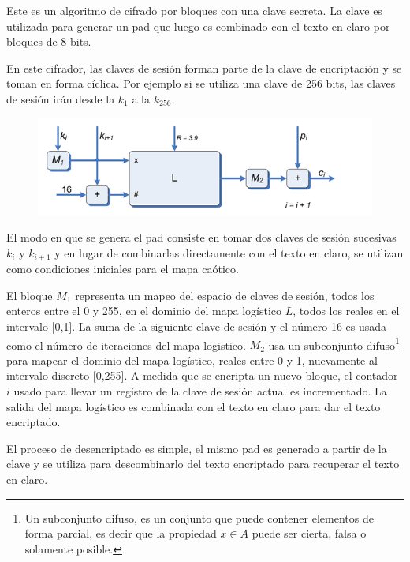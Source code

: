 \begin{example}
Este es un algoritmo de cifrado por bloques con una clave secreta. La clave es utilizada para generar un pad que luego es combinado con el texto en claro por bloques de 8 bits.

En este cifrador, las claves de sesión forman parte de la clave de encriptación y se toman en forma cíclica. Por ejemplo si se utiliza una clave de 256 bits, las claves de sesión irán desde la $k_1$ a la $k_{256}$.

\begin{figure}[H]
\centering
\includegraphics[width = \textwidth]{img/cifradoCaotico.png}
\end{figure}

El modo en que se genera el pad consiste en tomar dos claves de sesión sucesivas $k_i$ y $k_{i+1}$ y en lugar de combinarlas directamente con el texto en claro, se utilizan como condiciones iniciales para el mapa caótico.

El bloque $M_1$ representa un mapeo del espacio de claves de sesión, todos los enteros entre el 0 y 255, en el dominio del mapa logístico $L$, todos los reales en el intervalo [0,1]. La suma de la siguiente clave de sesión y el número 16 es usada como el número de iteraciones del mapa logistico. $M_2$ usa un subconjunto difuso\footnote{Un subconjunto difuso, es un conjunto que puede contener elementos de forma parcial, es decir que la propiedad  $x\in A$ puede ser cierta, falsa o solamente posible.} para mapear el dominio del mapa logístico, reales entre 0 y 1, nuevamente al intervalo discreto [0,255]. A medida que se encripta un nuevo bloque, el contador $i$ usado para llevar un registro de la clave de sesión actual es incrementado. La salida del mapa logístico es combinada con el texto en claro para dar el texto encriptado.

El proceso de desencriptado es simple, el mismo pad es generado a partir de la clave y se utiliza para descombinarlo del texto encriptado para recuperar el texto en claro.


\end{example}
